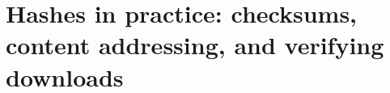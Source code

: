 \chapter{Hashes in practice: checksums, content addressing, and verifying downloads}
\label{ch:hashes-in-practice-checksums-content}

